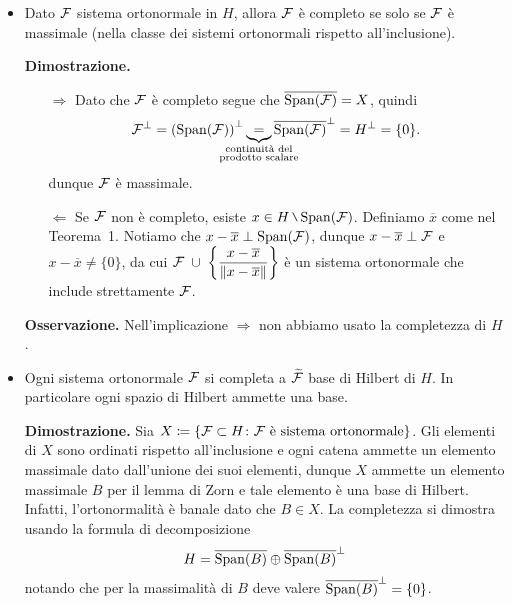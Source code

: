 \begin{itemize}
\newpage

\item Dato $\mathcal{F}$ sistema ortonormale in $H$, allora $\mathcal{F}$ è completo se solo se $\mathcal{F}$ è massimale (nella classe dei sistemi ortonormali rispetto all'inclusione).

\textbf{Dimostrazione.}
\begin{itemize}

\item[$\boxed{\Rightarrow}$] Dato che $\mathcal{F}$ è completo segue che $\overline{\operatorname{Span}(\mathcal{F})} = X$, quindi
%
$$
\mc{F}^{\perp} = \left( \spn(\mc{F}) \right)^\perp
\underbrace{=}_{\mathclap{\substack{\text{continuità del} \\ \text{prodotto scalare}}}} \overline{\spn(\mc{F})}^\perp = H^\perp = \{ 0 \}.
$$
%
dunque $\mathcal{F}$ è massimale.

\item[$\boxed{\Leftarrow}$] Se  $\mathcal{F}$ non è completo, esiste $x \in H \setminus \spn(\mc{F})$.
Definiamo $\overline{x}$ come nel Teorema~1. Notiamo che $x - \overline{x} \perp \operatorname{Span}(\mathcal{F})$, dunque $x - \overline{x} \perp \mathcal{F}$ e $x - \overline{x} \neq \{ 0 \}$, da cui $\displaystyle \mathcal{F} \; \cup \; \left\{ \frac{x - \overline{x}}{\left\lVert x - \overline{x} \right\rVert} \right\}$ è un sistema ortonormale che include strettamente $\mathcal{F}$. \absurd

\end{itemize}


\textbf{Osservazione.} Nell'implicazione $\boxed{\Rightarrow}$ non abbiamo usato la completezza di $H$.

\item Ogni sistema ortonormale $\mathcal{F}$ si completa a $\widetilde{\mathcal{F}}$ base di Hilbert di $H$. In particolare ogni spazio di Hilbert ammette una base.

\textbf{Dimostrazione.} Sia $X \coloneqq \left\{ \mathcal{F} \subset H \colon \mathcal{F} \text{ è sistema ortonormale} \right\}$. Gli elementi di $X$ sono ordinati rispetto all'inclusione e ogni catena ammette un elemento massimale dato dall'unione dei suoi elementi, dunque $X$ ammette un elemento massimale $B$ per il lemma di Zorn e tale elemento è una base di Hilbert.
Infatti, l'ortonormalità è banale dato che $B \in X$. La completezza si dimostra usando la formula di decomposizione
$$
	H = \overline{\operatorname{Span}(B)} \oplus \overline{\operatorname{Span}(B)}^\perp
$$
notando che per la massimalità di $B$ deve valere $\overline{\operatorname{Span}(B)}^\perp = \{0\}$.



\end{itemize}


